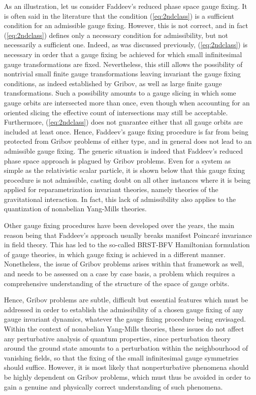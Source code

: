 \documentclass[a4paper,11pt]{article}
\begin{document}
As an illustration, let us consider Faddeev's reduced phase space gauge
fixing. It is often said in the literature that the condition 
(\ref{eq:2ndclass}) is a sufficient condition for an admissible gauge
fixing. However, this is not correct, and in fact (\ref{eq:2ndclass})
defines only a necessary condition for admissibility, but not 
necessarily a sufficient one. Indeed, as was discussed previously, 
(\ref{eq:2ndclass}) is necessary in order that a gauge fixing be achieved 
for which small infinitesimal gauge transformations are fixed. Nevertheless, 
this still allows the possibility of nontrivial small finite gauge 
transformations
leaving invariant the gauge fi\-xing conditions, as indeed established
by Gribov,\cite{Gribov} as well as large finite gauge transformations. 
Such a possibility amounts to a gauge slicing in which some
gauge orbits are intersected more than once, even though when accounting
for an oriented slicing the effective count of intersections may still be
acceptable.\cite{Gribov2} Furthermore, (\ref{eq:2ndclass}) does not 
guarantee either that all gauge orbits are included at least once. 
Hence, Faddeev's gauge fixing procedure is far from being protected from 
Gribov problems of either type, and in general does not lead to an 
admissible gauge fixing. The generic situation is indeed that Faddeev's 
reduced phase space approach is plagued by Gribov problems.\cite{JG1,JG4,JG5} 
Even for a system as simple as the relativistic
scalar particle, it is shown below that this gauge fixing procedure is
not admissible, casting doubt on all other instances where it is being
applied for reparametrization invariant theories, namely theories of the
gravitational interaction. In fact, this lack of admissibility also
applies to the quantization of nonabelian Yang-Mills theories.\cite{Gribov}

Other gauge fixing procedures have been developed over the years, the
main reason being that Faddeev's approach usually breaks manifest Poincar\'e
invariance in field theory. This has led to the so-called BRST-BFV
Hamiltonian formulation of gauge theories,\cite{JG1,BFV1} in which gauge 
fixing is achieved in a different manner. Nonetheless, the issue of Gribov 
problems arises within that framework as well,\cite{JG1,JG4,JG5} and needs to 
be assessed on a case by case basis, a problem which requires a comprehensive 
understanding of the structure of the space of gauge orbits.

Hence, Gribov problems are subtle, difficult but essential features which
must be addressed in order to establish the admissibility of a chosen gauge
fixing of any gauge invariant dynamics, whatever the gauge fixing procedure
being envisaged. Within the context of nonabelian Yang-Mills theories,
these issues do not affect any perturbative analysis of quantum properties,
since perturbation theory around the ground state amounts to a perturbation
within the neighbourhood of vanishing fields, so that the fixing of
the small in\-fi\-ni\-te\-si\-mal gauge symmetries should suffice. However, 
it is most likely that nonperturbative phenomena should be highly dependent
on Gribov problems, which must thus be avoided in order to gain a genuine
and physically correct understanding of such phenomena.
\end{document}
